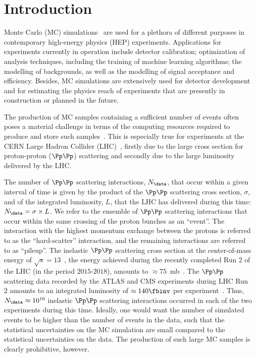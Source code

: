 \section{Introduction}
\label{sec:introduction}

Monte Carlo (MC) simulations~\cite{Kroese2014WhyTM,dunn2011exploring} are used for a plethora of different purposes in contemporary high-energy physics (HEP) experiments.
Applications for experiments currently in operation include detector calibration; optimization of analysis techniques, including the training of machine learning algorithms;
the modelling of backgrounds, as well as the modelling of signal acceptance and efficiency.
Besides, MC simulations are extensively used for detector development and for estimating the physics reach of experiments that are presently in construction or planned in the future.

The production of MC samples containing a sufficient number of events often poses a material challenge 
in terms of the computing resources required to produce and store such samples~\cite{HSFPhysicsEventGeneratorWG:2020gxw}.
This is especially true for experiments at the CERN Large Hadron Collider (LHC)~\cite{Bruning:2004ej,Buning:2004wk,Benedikt:2004wm},
firstly due to the large cross section for proton-proton ($\Pp\Pp$) scattering and secondly due to the large luminosity delivered by the LHC.

The number of $\Pp\Pp$ scattering interactions, $N_{\data}$, that occur within a given interval of time 
is given by the product of the $\Pp\Pp$ scattering cross section, $\sigma$, and of the integrated luminosity, $L$, that the LHC has delivered during this time:
$N_{\data} = \sigma \times L$.
We refer to the ensemble of $\Pp\Pp$ scattering interactions that occur within the same crossing of the proton bunches as an ``event''.
The interaction with the highest momentum exchange between the protons is referred to as the ``hard-scatter'' interaction,
and the remaining interactions are referred to as ``pileup''.
The inelastic $\Pp\Pp$ scattering cross section at the center-of-mass energy of $\sqrt{s}=13$~\TeV, the energy achieved during the recently completed Run $2$ of the LHC (in the period $2015$-$2018$),
amounts to $\approx 75$~mb~\cite{Aaboud:2016mmw,Sirunyan:2018nqx}.
The $\Pp\Pp$ scattering data recorded by the ATLAS and CMS experiments during LHC Run $2$ 
amounts to an integrated luminosity of $\approx 140\fbinv$ per experiment~\cite{ATLAS-CONF-2019-021,LUM-17-001,LUM-17-004,LUM-18-002}.
Thus, $N_{\data} \approx 10^{16}$ inelastic $\Pp\Pp$ scattering interactions occurred in each of the two experiments during this time.
Ideally, one would want the number of simulated events to be higher than the number of events in the data,
such that the statistical uncertainties on the MC simulation are small compared to the statistical uncertainties on the data.
The production of such large MC samples is clearly prohibitive, however.

